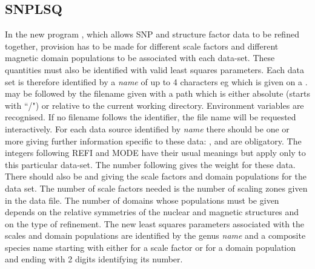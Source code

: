  \subsection{SNPLSQ}
 In the new program , which allows SNP and structure factor data to be refined
 together, provision has to be made for different scale factors and different
 magnetic domain populations to be associated with each data-set. These quantities must 
 also be identified with valid least squares parameters. Each data set is therefore identified by a
 {\em name} of up to 4 characters eg  which is given on a 
 \hyperlink{Q:sorc}{}. 
 may be followed by the filename given with a path which is either absolute (starts with ``/")
 or relative to the current working directory. Environment variables are recognised.
 If no filename follows the identifier, the file name will be requested interactively.
 For each data source identified by {\em name}  there should be one or more  
 giving further information specific to these data: ,  and  are obligatory. The
integers following REFI and MODE have their usual meanings but apply only to this particular data-set. The number following  gives the weight for these data. 
\p
There should also
be  and  giving the scale factors and domain populations
for the data set. The number of scale factors needed is the number of scaling zones
given in the data file. The number of domains whose populations must be given depends
on the relative symmetries of the nuclear and magnetic structures and on the type of refinement.  
The new least squares parameters associated with the scales and domain populations are identified by the genus {\em name} and a composite species name starting with either  for a scale factor
or  for a domain population and ending with 2 digits identifying its number.

